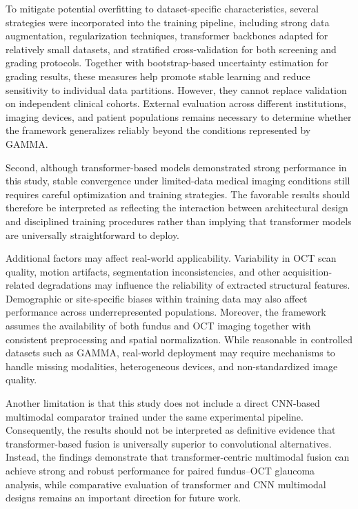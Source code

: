 \documentclass[preprint,12pt]{elsarticle}
\begin{document}
To mitigate potential overfitting to dataset-specific characteristics, several strategies were incorporated into the training pipeline, including strong data augmentation, regularization techniques, transformer backbones adapted for relatively small datasets, and stratified cross-validation for both screening and grading protocols. Together with bootstrap-based uncertainty estimation for grading results, these measures help promote stable learning and reduce sensitivity to individual data partitions. However, they cannot replace validation on independent clinical cohorts. External evaluation across different institutions, imaging devices, and patient populations remains necessary to determine whether the framework generalizes reliably beyond the conditions represented by GAMMA.

Second, although transformer-based models demonstrated strong performance in this study, stable convergence under limited-data medical imaging conditions still requires careful optimization and training strategies. The favorable results should therefore be interpreted as reflecting the interaction between architectural design and disciplined training procedures rather than implying that transformer models are universally straightforward to deploy.

Additional factors may affect real-world applicability. Variability in OCT scan quality, motion artifacts, segmentation inconsistencies, and other acquisition-related degradations may influence the reliability of extracted structural features. Demographic or site-specific biases within training data may also affect performance across underrepresented populations. Moreover, the framework assumes the availability of both fundus and OCT imaging together with consistent preprocessing and spatial normalization. While reasonable in controlled datasets such as GAMMA, real-world deployment may require mechanisms to handle missing modalities, heterogeneous devices, and non-standardized image quality.

Another limitation is that this study does not include a direct CNN-based multimodal comparator trained under the same experimental pipeline. Consequently, the results should not be interpreted as definitive evidence that transformer-based fusion is universally superior to convolutional alternatives. Instead, the findings demonstrate that transformer-centric multimodal fusion can achieve strong and robust performance for paired fundus–OCT glaucoma analysis, while comparative evaluation of transformer and CNN multimodal designs remains an important direction for future work.
\end{document}
